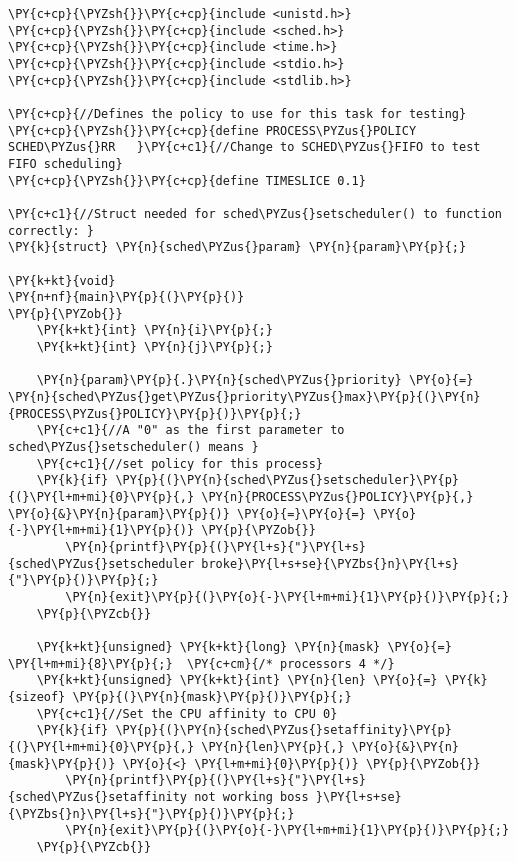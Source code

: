 \begin{Verbatim}[commandchars=\\\{\}]
\PY{c+cp}{\PYZsh{}}\PY{c+cp}{include <unistd.h>}
\PY{c+cp}{\PYZsh{}}\PY{c+cp}{include <sched.h>}
\PY{c+cp}{\PYZsh{}}\PY{c+cp}{include <time.h>}
\PY{c+cp}{\PYZsh{}}\PY{c+cp}{include <stdio.h>}
\PY{c+cp}{\PYZsh{}}\PY{c+cp}{include <stdlib.h>}

\PY{c+cp}{//Defines the policy to use for this task for testing}
\PY{c+cp}{\PYZsh{}}\PY{c+cp}{define PROCESS\PYZus{}POLICY SCHED\PYZus{}RR	}\PY{c+c1}{//Change to SCHED\PYZus{}FIFO to test FIFO scheduling}
\PY{c+cp}{\PYZsh{}}\PY{c+cp}{define TIMESLICE 0.1}

\PY{c+c1}{//Struct needed for sched\PYZus{}setscheduler() to function correctly: }
\PY{k}{struct} \PY{n}{sched\PYZus{}param} \PY{n}{param}\PY{p}{;}

\PY{k+kt}{void}
\PY{n+nf}{main}\PY{p}{(}\PY{p}{)}
\PY{p}{\PYZob{}}
	\PY{k+kt}{int} \PY{n}{i}\PY{p}{;}
	\PY{k+kt}{int} \PY{n}{j}\PY{p}{;}

	\PY{n}{param}\PY{p}{.}\PY{n}{sched\PYZus{}priority} \PY{o}{=} \PY{n}{sched\PYZus{}get\PYZus{}priority\PYZus{}max}\PY{p}{(}\PY{n}{PROCESS\PYZus{}POLICY}\PY{p}{)}\PY{p}{;}
	\PY{c+c1}{//A "0" as the first parameter to sched\PYZus{}setscheduler() means }
	\PY{c+c1}{//set policy for this process}
	\PY{k}{if} \PY{p}{(}\PY{n}{sched\PYZus{}setscheduler}\PY{p}{(}\PY{l+m+mi}{0}\PY{p}{,} \PY{n}{PROCESS\PYZus{}POLICY}\PY{p}{,} \PY{o}{&}\PY{n}{param}\PY{p}{)} \PY{o}{=}\PY{o}{=} \PY{o}{-}\PY{l+m+mi}{1}\PY{p}{)} \PY{p}{\PYZob{}}
		\PY{n}{printf}\PY{p}{(}\PY{l+s}{"}\PY{l+s}{sched\PYZus{}setscheduler broke}\PY{l+s+se}{\PYZbs{}n}\PY{l+s}{"}\PY{p}{)}\PY{p}{;}
		\PY{n}{exit}\PY{p}{(}\PY{o}{-}\PY{l+m+mi}{1}\PY{p}{)}\PY{p}{;}
	\PY{p}{\PYZcb{}}

	\PY{k+kt}{unsigned} \PY{k+kt}{long} \PY{n}{mask} \PY{o}{=} \PY{l+m+mi}{8}\PY{p}{;}	\PY{c+cm}{/* processors 4 */}
	\PY{k+kt}{unsigned} \PY{k+kt}{int} \PY{n}{len} \PY{o}{=} \PY{k}{sizeof} \PY{p}{(}\PY{n}{mask}\PY{p}{)}\PY{p}{;}
	\PY{c+c1}{//Set the CPU affinity to CPU 0}
	\PY{k}{if} \PY{p}{(}\PY{n}{sched\PYZus{}setaffinity}\PY{p}{(}\PY{l+m+mi}{0}\PY{p}{,} \PY{n}{len}\PY{p}{,} \PY{o}{&}\PY{n}{mask}\PY{p}{)} \PY{o}{<} \PY{l+m+mi}{0}\PY{p}{)} \PY{p}{\PYZob{}}
		\PY{n}{printf}\PY{p}{(}\PY{l+s}{"}\PY{l+s}{sched\PYZus{}setaffinity not working boss }\PY{l+s+se}{\PYZbs{}n}\PY{l+s}{"}\PY{p}{)}\PY{p}{;}
		\PY{n}{exit}\PY{p}{(}\PY{o}{-}\PY{l+m+mi}{1}\PY{p}{)}\PY{p}{;}
	\PY{p}{\PYZcb{}}


\end{Verbatim}
